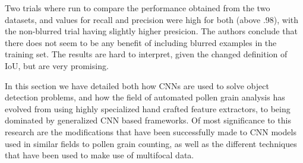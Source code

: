Two trials where run to compare the performance obtained from the two datasets, and values for recall and precision were high for both (above .98), with the non-blurred trial having slightly higher presicion.
The authors conclude that there does not seem to be any benefit of including blurred examples in the training set.
The results are hard to interpret, given the changed definition of IoU, but are very promising.

In this section we have detailed both how CNNs are used to solve object detection problems, and how the field of automated pollen grain analysis has evolved from using highly specialized hand crafted feature extractors, to being dominated by generalized CNN based frameworks.
Of most significance to this research are the modifications that have been successfully made to CNN models used in similar fields to pollen grain counting, as well as the different techniques that have been used to make use of multifocal data.
